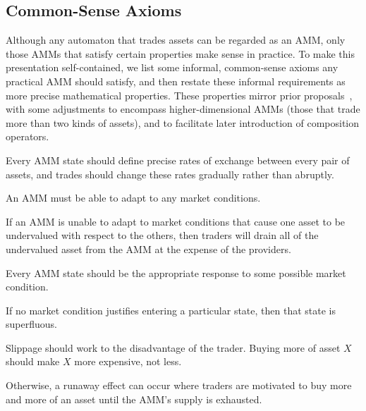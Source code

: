 \subsection{Common-Sense Axioms}
Although any automaton that trades assets can be regarded as an AMM,
only those AMMs that satisfy certain properties
make sense in practice.
To make this presentation self-contained,
we list some informal, common-sense axioms any practical AMM should satisfy,
and then restate these informal requirements as more precise mathematical properties.
These properties mirror prior proposals~\cite{AngerisC2020,Berenzon2020,krishnamachari2021dynamic},
with some adjustments to encompass higher-dimensional AMMs 
(those that trade more than two kinds of assets),
and to facilitate later introduction of composition operators.

\begin{informal}[Continuity]
Every AMM state should define precise rates of exchange
between every pair of assets,
and trades should change these rates gradually rather than abruptly.
\end{informal}

\begin{informal}[Expressivity]
An AMM must be able to adapt to any market conditions.
\end{informal}
If an AMM is unable to adapt to market conditions that
cause one asset to be undervalued with respect to the others,
then traders will drain all of the undervalued asset from the AMM
at the expense of the providers.

\begin{informal}[Stability]
Every AMM state should be the appropriate response to some possible market condition.
\end{informal}
If no market condition justifies entering a particular state,
then that state is superfluous.

\begin{informal}[Convexity]
Slippage should work to the disadvantage of the trader.
Buying more of asset $X$ should make $X$ more expensive, not less.
\end{informal}

Otherwise, a runaway effect can occur where traders are motivated
to buy more and more of an asset until the AMM's supply is exhausted.

